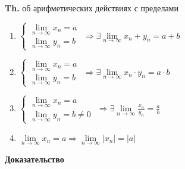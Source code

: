 \documentclass[14pt, letter paper]{article}
\begin{document}
\textbf{Th.} об арифметических действиях с пределами

\begin{enumerate}
    \item $\begin{cases}
        \lim\limits_{n \rightarrow \infty}{x_n} = a \\
        \lim\limits_{n \rightarrow \infty}{y_n} = b
    \end{cases}$
    $\Rightarrow \exists \lim\limits_{n \rightarrow \infty}{x_n + y_n} = a + b$

    \item $\begin{cases}
        \lim\limits_{n \rightarrow \infty}{x_n} = a \\
        \lim\limits_{n \rightarrow \infty}{y_n} = b
    \end{cases}$
    $\Rightarrow \exists \lim\limits_{n \rightarrow \infty}{x_n \cdot y_n} = a \cdot b$

    \item $\begin{cases}
        \lim\limits_{n \rightarrow \infty}{x_n} = a \\
        \lim\limits_{n \rightarrow \infty}{y_n} = b \neq 0
    \end{cases}$
    $\Rightarrow \exists \lim\limits_{n \rightarrow \infty}{\frac{x_n}{y_n}} = \frac{a}{b}$

    \item $\lim\limits_{n \rightarrow \infty}{x_n} = a \Rightarrow \lim\limits_{n \rightarrow \infty}{|x_n|} = |a|$
\end{enumerate}

\begin{center}
    \textbf{Доказательство}
\end{center}
\end{document}
